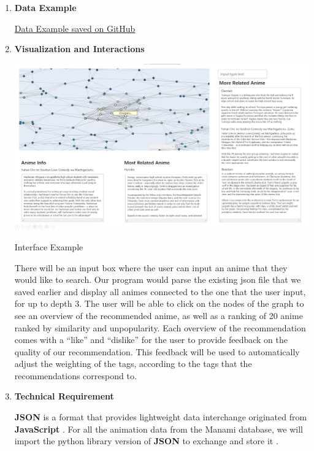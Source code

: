 \documentclass[fontsize=11pt]{article}
\begin{document}
\begin{enumerate}
    \item \textbf{Data Example}
    
    \href{https://gist.github.com/RealFakeAccount/cf34244d17039e78512428a1cf51d95f}{Data Example saved on GitHub} \citep{manami}
    
    \item \textbf{Visualization and Interactions}
    
    \begin{center}
        \includegraphics[scale=.2]{Interface Example.png}
        
        Interface Example
    \end{center}
    
    \quad There will be an input box where the user can input an anime that they would like to search. Our program would parse the existing json file that we saved earlier and display all animes connected to the one that the user input, for up to depth 3. The user will be able to click on the nodes of the graph to see an overview of the recommended anime, as well as a ranking of 20 anime ranked by similarity and unpopularity. Each overview of the recommendation comes with a “like” and “dislike” for the user to provide feedback on the quality of our recommendation. This feedback will be used to automatically adjust the weighting of the tags, according to the tags that the recommendations correspond to.
    
    \item \textbf{Technical Requirement}
    
    \quad \textbf{JSON} is a format that provides lightweight data interchange originated from \textbf{JavaScript} \citep{JSON21}. For all the animation data from the Manami database, we will import the python library version of \textbf{JSON} to exchange and store it \citep{Pyjson}. 


\end{enumerate}
\end{document}
